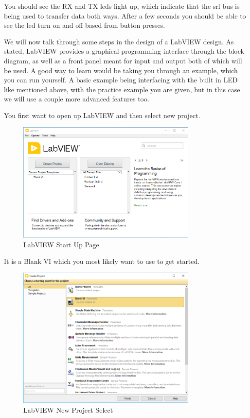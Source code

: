 \documentclass[a4paper,11pt]{report}
\begin{document}
You should see the RX and TX \gls{led}s light up, which indicate that the \gls{srl} bus is being used to transfer data both ways. After a few seconds you should be able to see the \gls{led} turn on and off based from button presses.



We will now talk through some steps in the design of a LabVIEW design. As stated, LabVIEW provides a graphical programming interface through the block diagram, as well as a front panel meant for input and output both of which will be used. A good way to learn would be taking you through an example, which you can run yourself. A basic example being interfacing with the built in LED like mentioned above, with the practice example you are given, but in this case we will use a couple more advanced features too.

You first want to open up LabVIEW and then select new project.

\begin{figure}[H]
\centering
\includegraphics[width=0.8\textwidth]{screenshots/labview1}
\caption{LabVIEW Start Up Page}
\end{figure}

It is a Blank VI which you most likely want to use to get started.

\begin{figure}[H]
\centering
\includegraphics[width=0.8\textwidth]{screenshots/labview2}
\caption{LabVIEW New Project Select}
\end{figure}
\end{document}
